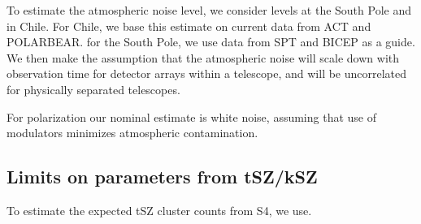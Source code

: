 To estimate the atmospheric noise level, we consider levels at the South Pole and in Chile. For Chile, we base this estimate on current data from ACT and POLARBEAR. for the South Pole, we use data from SPT and BICEP as a guide. We then make the assumption that the atmospheric noise will scale down with observation time for detector arrays within a telescope, and will be uncorrelated for physically separated telescopes.

For polarization our nominal estimate is white noise, assuming that use of modulators minimizes atmospheric contamination.

%

\subsection{Limits on parameters from tSZ/kSZ}

To estimate the expected tSZ cluster counts from S4, we use.
